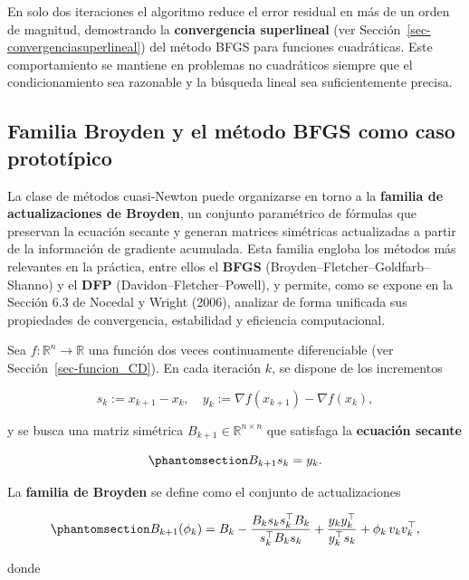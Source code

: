 \documentclass[
  spanish,
  us-letterpaper,
]{scrreprt}
\numberwithin{equation}{section}
\begin{document}
En solo dos iteraciones el algoritmo reduce el error residual en más de
un orden de magnitud, demostrando la \textbf{convergencia superlineal}
(ver Sección~\ref{sec-convergenciasuperlineal}) del método BFGS para
funciones cuadráticas. Este comportamiento se mantiene en problemas no
cuadráticos siempre que el condicionamiento sea razonable y la búsqueda
lineal sea suficientemente precisa.

\subsection{Familia Broyden y el método BFGS como caso
prototípico}\label{familia-broyden-y-el-muxe9todo-bfgs-como-caso-prototuxedpico}

La clase de métodos cuasi-Newton puede organizarse en torno a la
\textbf{familia de actualizaciones de Broyden}, un conjunto paramétrico
de fórmulas que preservan la ecuación secante y generan matrices
simétricas actualizadas a partir de la información de gradiente
acumulada. Esta familia engloba los métodos más relevantes en la
práctica, entre ellos el \textbf{BFGS}
(Broyden--Fletcher--Goldfarb--Shanno) y el \textbf{DFP}
(Davidon--Fletcher--Powell), y permite, como se expone en la Sección 6.3
de Nocedal y Wright (2006), analizar de forma unificada sus propiedades
de convergencia, estabilidad y eficiencia computacional.

Sea \(f : \mathbb{R}^n \to \mathbb{R}\) una función dos veces
continuamente diferenciable (ver Sección~\ref{sec-funcion_CD}). En cada
iteración \(k\), se dispone de los incrementos

\[
s_k := x_{k+1} - x_k, \quad y_k := \nabla f(x_{k+1}) - \nabla f(x_k),
\]

y se busca una matriz simétrica \(B_{k+1} \in \mathbb{R}^{n \times n}\)
que satisfaga la \textbf{ecuación secante}

\begin{equation}\phantomsection\label{eq-11}{
B_{k+1} s_k = y_k. 
}\end{equation}

La \textbf{familia de Broyden} se define como el conjunto de
actualizaciones

\begin{equation}\phantomsection\label{eq-broy}{
B_{k+1}(\phi_k) = B_k - \frac{B_k s_k s_k^\top B_k}{s_k^\top B_k s_k}
+ \frac{y_k y_k^\top}{y_k^\top s_k} + \phi_k\, v_k v_k^\top,
}\end{equation}

donde
\end{document}
